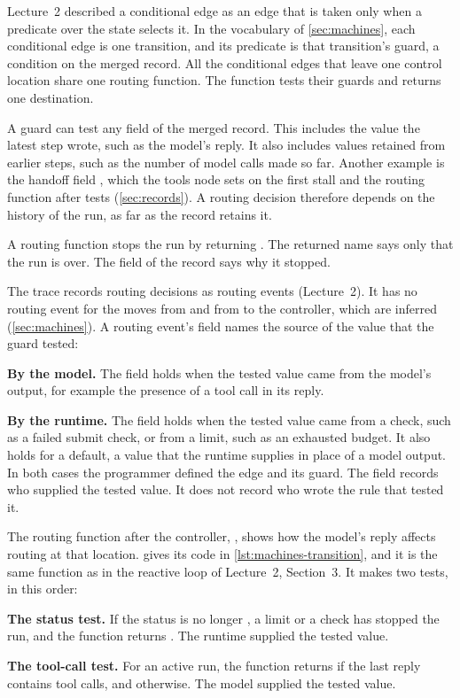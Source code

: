Lecture~2 described a conditional edge as an edge that is taken only when a predicate over the state
selects it. In the vocabulary of \cref{sec:machines}, each conditional edge is one transition, and
its predicate is that transition's guard, a condition on the merged record. All the conditional
edges that leave one control location share one routing function. The function tests their guards
and returns one destination.

A guard can test any field of the merged record. This includes the value the latest step wrote,
such as the model's reply. It also includes values retained from earlier steps, such as the number
of model calls made so far. Another example is the handoff field , which the
tools node sets on the first stall and the routing function after  tests
(\cref{sec:records}). A routing
decision therefore depends on the history of the run, as far as the record retains it.

A routing function stops the run by returning . The returned name says only that the
run is over. The  field of the record says why it stopped.

The trace records routing decisions as routing events (Lecture~2). It has no routing event for the
moves from  and from  to the controller, which are inferred
(\cref{sec:machines}). A routing event's  field names the source of the value that the
guard tested:
\bi
\item \textbf{By the model.} The field holds  when the tested value came from the
model's output, for example the presence of a tool call in its reply.
\item \textbf{By the runtime.} The field holds  when the tested value came from a
check, such as a failed submit check, or from a limit, such as an exhausted budget. It also holds
 for a default, a value that the runtime supplies in place of a model output.
\ei
In both cases the programmer defined the edge and its guard. The  field records who
supplied the tested value. It does not record who wrote the rule that tested it.

The routing function after the controller, , shows how the model's reply
affects routing at that location.  gives its code in \cref{lst:machines-transition},
and it is the same function as in the reactive loop of Lecture~2, Section~3. It makes two tests, in
this order:
\bi
\item \textbf{The status test.} If the status is no longer , a limit or a check has
stopped the run, and the function returns . The runtime supplied the tested value.
\item \textbf{The tool-call test.} For an active run, the function returns  if the
last reply contains tool calls, and  otherwise. The model supplied the tested
value.
\ei


